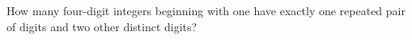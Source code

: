 How many four-digit integers beginning with one have exactly one repeated pair of digits and two other distinct digits?
